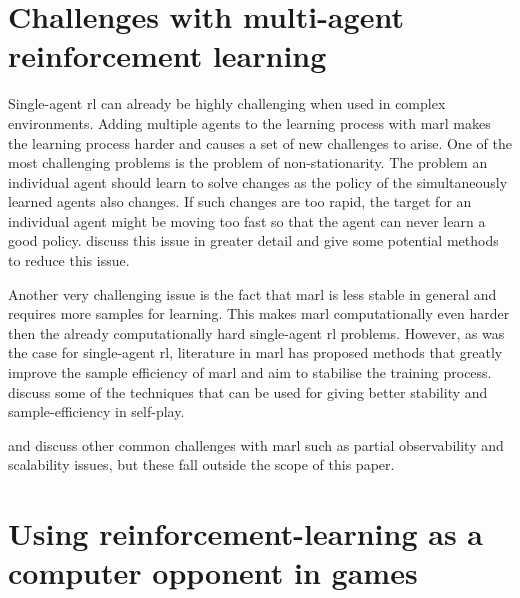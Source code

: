 
\section{Challenges with multi-agent reinforcement learning}
\label{sec:marl-challenges} 

Single-agent \gls{rl} can already be highly challenging when used in complex environments.
Adding multiple agents to the learning process with \gls{marl} makes the learning process harder and causes a set of new challenges to arise.
One of the most challenging problems is the problem of non-stationarity.
The problem an individual agent should learn to solve changes as the policy of the simultaneously learned agents also changes.
If such changes are too rapid, the target for an individual agent might be moving too fast so that the agent can never learn a good policy.
 discuss this issue in greater detail and give some potential methods to reduce this issue.

Another very challenging issue is the fact that \gls{marl} is less stable in general and requires more samples for learning.
This makes \gls{marl} computationally even harder then the already computationally hard single-agent \gls{rl} problems.
However, as was the case for single-agent \gls{rl}, literature in \gls{marl} has proposed methods that greatly improve the sample efficiency of \gls{marl} and aim to stabilise the training process.
\citet{selfplay} discuss some of the techniques that can be used for giving better stability and sample-efficiency in self-play. 

 and \citet{marl_intro} discuss other common challenges with \gls{marl} such as partial observability and scalability issues, but these fall outside the scope of this paper.


\section{Using reinforcement-learning as a computer opponent in games}
\label{sec:marl-games_opponent}

